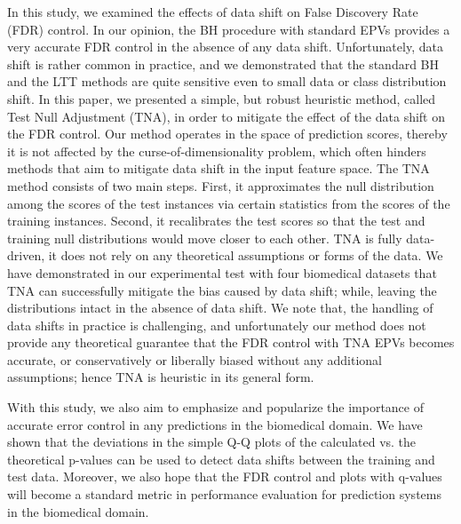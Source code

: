 \documentclass[10pt,letterpaper]{article}
\begin{document}
In this study, we examined the effects of data shift on False Discovery Rate (FDR) control.
In our opinion, the BH procedure with standard EPVs provides a very accurate FDR control in the absence of any data shift.
Unfortunately, data shift is rather common in practice, and we demonstrated that the standard BH and the LTT methods are quite sensitive even to small data or class distribution shift.
In this paper, we presented a simple, but robust heuristic method, called Test Null Adjustment (TNA), in order to mitigate the effect of the data shift on the FDR control.
Our method operates in the space of prediction scores, thereby it is not affected by the curse-of-dimensionality problem, which often hinders methods that aim to mitigate data shift in the input feature space.
The TNA method consists of two main steps.
First, it approximates the null distribution among the scores of the test instances via certain statistics from the scores of the training instances.
Second, it recalibrates the test scores so that the test and training null distributions would move closer to each other.
TNA is fully data-driven, it does not rely on any theoretical assumptions or forms of the data.
We have demonstrated in our experimental test with four biomedical datasets that TNA can successfully mitigate the bias caused by data shift; while, leaving the distributions intact in the absence of data shift.
We note that, the handling of data shifts in practice is challenging, and unfortunately our method does not provide any theoretical guarantee that the FDR control with TNA EPVs becomes accurate, or conservatively or liberally biased without any additional assumptions; hence TNA is heuristic in its general form.

With this study, we also aim to emphasize and popularize the importance of accurate error control in any predictions in the biomedical domain.
We have shown that the deviations in the simple Q-Q plots of the calculated vs. the theoretical p-values can be used to detect data shifts between the training and test data.
Moreover, we also hope that the FDR control and plots with q-values will become a standard metric in performance evaluation for prediction systems in the biomedical domain.

\nolinenumbers

%
%

\end{document}
